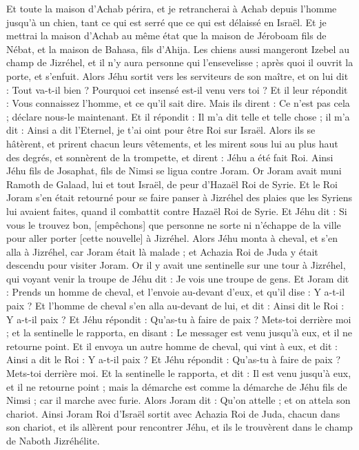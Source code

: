 \begin{multicols}{2}
Et toute la maison d'Achab périra, et je retrancherai à Achab depuis l'homme jusqu'à un chien, tant ce qui est serré que ce qui est délaissé en Israël.
Et je mettrai la maison d'Achab au même état que la maison de Jéroboam fils de Nébat, et la maison de Bahasa, fils d'Ahija.
Les chiens aussi mangeront Izebel au champ de Jizréhel, et il n'y aura personne qui l'ensevelisse ; après quoi il ouvrit la porte, et s'enfuit.
Alors Jéhu sortit vers les serviteurs de son maître, et on lui dit : Tout va-t-il bien ? Pourquoi cet insensé est-il venu vers toi ? Et il leur répondit : Vous connaissez l'homme, et ce qu'il sait dire.
Mais ils dirent : Ce n'est pas cela ; déclare nous-le maintenant. Et il répondit : Il m'a dit telle et telle chose ; il m'a dit : Ainsi a dit l'Eternel, je t'ai oint pour être Roi sur Israël.
Alors ils se hâtèrent, et prirent chacun leurs vêtements, et les mirent sous lui au plus haut des degrés, et sonnèrent de la trompette, et dirent : Jéhu a été fait Roi.
Ainsi Jéhu fils de Josaphat, fils de Nimsi se ligua contre Joram. Or Joram avait muni Ramoth de Galaad, lui et tout Israël, de peur d'Hazaël Roi de Syrie.
Et le Roi Joram s'en était retourné pour se faire panser à Jizréhel des plaies que les Syriens lui avaient faites, quand il combattit contre Hazaël Roi de Syrie. Et Jéhu dit : Si vous le trouvez bon, [empêchons] que personne ne sorte ni n'échappe de la ville pour aller porter [cette nouvelle] à Jizréhel.
Alors Jéhu monta à cheval, et s'en alla à Jizréhel, car Joram était là malade ; et Achazia Roi de Juda y était descendu pour visiter Joram.
Or il y avait une sentinelle sur une tour à Jizréhel, qui voyant venir la troupe de Jéhu dit : Je vois une troupe de gens. Et Joram dit : Prends un homme de cheval, et l'envoie au-devant d'eux, et qu'il dise : Y a-t-il paix ?
Et l'homme de cheval s'en alla au-devant de lui, et dit : Ainsi dit le Roi : Y a-t-il paix ? Et Jéhu répondit : Qu'as-tu à faire de paix ? Mets-toi derrière moi ; et la sentinelle le rapporta, en disant : Le messager est venu jusqu'à eux, et il ne retourne point.
Et il envoya un autre homme de cheval, qui vint à eux, et dit : Ainsi a dit le Roi : Y a-t-il paix ? Et Jéhu répondit : Qu'as-tu à faire de paix ? Mets-toi derrière moi.
Et la sentinelle le rapporta, et dit : Il est venu jusqu'à eux, et il ne retourne point ; mais la démarche est comme la démarche de Jéhu fils de Nimsi ; car il marche avec furie.
Alors Joram dit : Qu'on attelle ; et on attela son chariot. Ainsi Joram Roi d'Israël sortit avec Achazia Roi de Juda, chacun dans son chariot, et ils allèrent pour rencontrer Jéhu, et ils le trouvèrent dans le champ de Naboth Jizréhélite.

\end{multicols}
